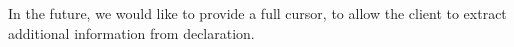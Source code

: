 
\begin{DoxyRefList}
\item[\label{todo__todo000001}%
\Hypertarget{todo__todo000001}%
Member \hyperlink{structCXCompletionResult_adfd21960b683399da375ff0ed10527b7}{C\+X\+Completion\+Result\+:\+:Cursor\+Kind} ]In the future, we would like to provide a full cursor, to allow the client to extract additional information from declaration. 
\end{DoxyRefList}
